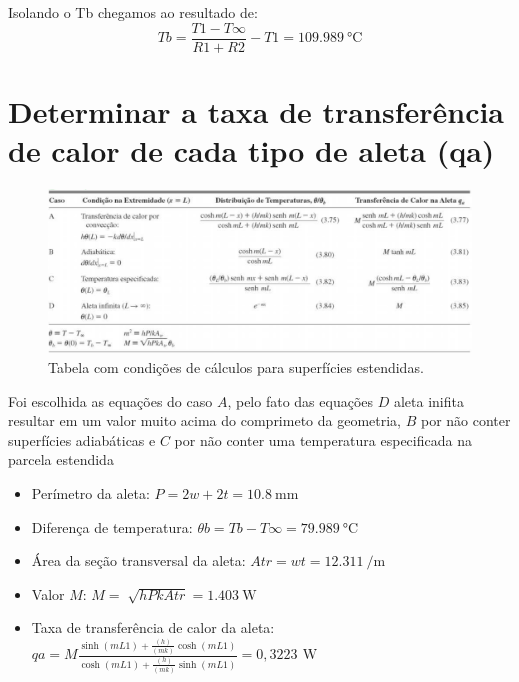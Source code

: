 Isolando o Tb chegamos ao resultado de:
\begin{equation}
    {Tb}={\frac{T1 -T\infty}{{R1}+{R2}}}-{T1} = \SI{109,989}{\degreeCelsius}
\end{equation}

\clearpage

\section{Determinar a taxa de transferência de calor de cada tipo de aleta (qa)}\label{sec:calcTable}

\begin{figure}[h]
    \centering
    \caption{Tabela com condições de cálculos para superfícies estendidas.}
    \label{fig:tabelaCasosCalc}
    \includegraphics[width=15cm]{figuras/tabelaCasosCalc.jpg}
\end{figure}

Foi escolhida as equações do caso \(A\), pelo fato das equações
\(D\) aleta inifita resultar em um valor muito acima do comprimeto da
geometria,
\(B\) por não conter superfícies adiabáticas
e \(C\) por não conter uma temperatura especificada na parcela estendida
\begin{itemize}[leftmargin=2cm]
    \item Perímetro da aleta: \(
          {P}={2w+2t} = \SI{10,8}{\milli\meter}
          \)
    \item Diferença de temperatura: \(
          {\theta}b={{Tb}-{T\infty}} = \SI{79,989}{\degreeCelsius}
          \)
    \item Área da seção transversal da aleta: \(
          {Atr}={{w}{t}} = \SI{12,311}{\per\meter}
          \)
    \item Valor \(M\): \(
          {M}={\sqrt[]{{h}{P}{k}{Atr}}} = \SI{1,403}{\watt}
          \)
    \item Taxa de transferência
          de calor da aleta: \\\(
          {qa}={M}{
          \frac
          {\sinh{(mL1)}+{\frac{(h)}{(mk)}}{\cosh{(mL1)}}}
          {\cosh{(mL1)}+{\frac{(h)}{(mk)}}{\sinh{(mL1)}}}
          }={0,3223\,\SI{}{\watt}}
          \)
\end{itemize}

